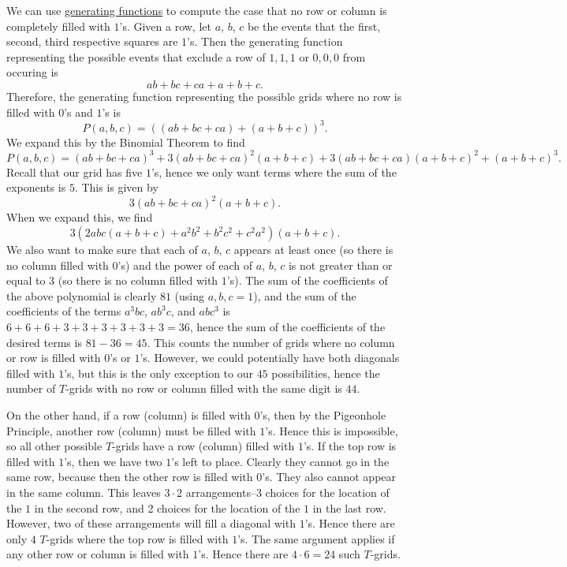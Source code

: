 \begin{enumerate}
We can use \href{https://artofproblemsolving.com/wiki/index.php?title=Generating\_functions}{generating functions} to compute the case that no row or column is completely filled with $1$'s. Given a row, let $a$, $b$, $c$ be the events that the first, second, third respective squares are $1$'s. Then the generating function representing the possible events that exclude a row of $1,1,1$ or $0,0,0$ from occuring is
 \[ab+bc+ca+a+b+c.\]Therefore, the generating function representing the possible grids where no row is filled with $0$'s and $1$'s is
 \[P(a,b,c)=((ab+bc+ca)+(a+b+c))^3.\]We expand this by the Binomial Theorem to find
 \[P(a,b,c)=(ab+bc+ca)^3+3(ab+bc+ca)^2(a+b+c)+3(ab+bc+ca)(a+b+c)^2+(a+b+c)^3.\]Recall that our grid has five $1$'s, hence we only want terms where the sum of the exponents is $5$. This is given by
 \[3(ab+bc+ca)^2(a+b+c).\]When we expand this, we find
 \[3(2abc(a+b+c)+a^2b^2+b^2c^2+c^2a^2)(a+b+c).\]We also want to make sure that each of $a$, $b$, $c$ appears at least once (so there is no column filled with $0$'s) and the power of each of $a$, $b$, $c$ is not greater than or equal to $3$ (so there is no column filled with $1$'s). The sum of the coefficients of the above polynomial is clearly $81$ (using $a,b,c=1$), and the sum of the coefficients of the terms $a^3bc$, $ab^3c$, and $abc^3$ is $6+6+6+3+3+3+3+3+3=36$, hence the sum of the coefficients of the desired terms is $81-36=45$. This counts the number of grids where no column or row is filled with	$0$'s or $1$'s. However, we could potentially have both diagonals filled with $1$'s, but this is the only exception to our $45$ possibilities, hence the number of $T$-grids with no row or column filled with the same digit is $44$.

 On the other hand, if a row (column) is filled with $0$'s, then by the Pigeonhole Principle, another row (column) must be filled with $1$'s. Hence this is impossible, so all other	possible $T$-grids have a row (column) filled with $1$'s. If the top row is filled with $1$'s, then we have two $1$'s left to place. Clearly they cannot go in the same row, because then the other row is filled with $0$'s. They also cannot appear in the same column. This leaves $3\cdot 2$ arrangements--3 choices for the location of the $1$ in the second row, and 2 choices for the location of the $1$ in the last row. However, two of these arrangements will fill a diagonal with $1$'s. Hence there are only $4$ $T$-grids where the top row is filled with $1$'s. The same argument applies if any other row or column is filled with $1$'s. Hence there are $4\cdot 6=24$ such $T$-grids.


\end{enumerate}
